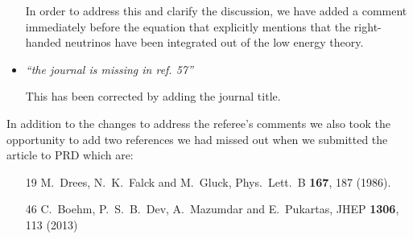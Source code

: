 \documentclass[12pt]{article}
\begin{document}
\begin{itemize}
In order to address this and clarify the discussion, we have added a comment
immediately before the equation that explicitly mentions that the right-handed
neutrinos have been integrated out of the low energy theory.

\item {\it ``the journal is missing in ref. 57''}

This has been corrected by adding the journal title.


\end{itemize}

In addition to the changes to address the referee's comments we also took the
opportunity to add two references we had missed out when we submitted the
article to PRD which are:
\begin{itemize}
\item [19]  M.~Drees, N.~K.~Falck and M.~Gluck, Phys.\ Lett.\ B {\bf 167},
187 (1986).
\item [46]  C.~Boehm, P.~S.~B.~Dev, A.~Mazumdar and E.~Pukartas, JHEP
{\bf 1306}, 113 (2013)
\end{itemize}
\end{document}
